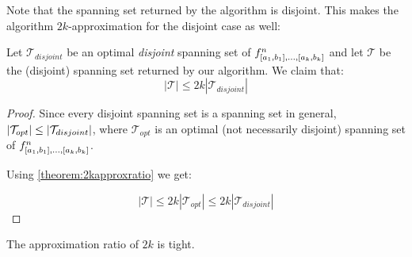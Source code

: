 Note that the spanning set returned by the algorithm
is disjoint.
This makes the algorithm $2k$-approximation
for the disjoint case as well:

\begin{theorem}
Let $\mathcal{T}_{disjoint}$ be an optimal \emph{disjoint}
spanning set of
$f^n_{[a_1, b_1], \ldots, [a_k, b_k]}$
and let $\mathcal{T}$ be the (disjoint)
spanning set returned by our algorithm.
We claim that:
\begin{equation*}
|\mathcal{T}| \leq 2k |\mathcal{T}_{disjoint}|
\end{equation*}
\end{theorem}

\begin{proof}
Since every disjoint spanning set
is a spanning set in general,
$\lvert\mathcal{T}_{opt}\rvert \leq
\lvert\mathcal{T}_{disjoint}\rvert$,
where $\mathcal{T}_{opt}$ is an optimal
(not necessarily disjoint)
spanning set of
$f^n_{[a_1, b_1], \ldots, [a_k, b_k]}$.

Using \autoref{theorem:2kapproxratio} we get:

\begin{equation*}
|\mathcal{T}| \leq 2k |\mathcal{T}_{opt}|
\leq 2k |\mathcal{T}_{disjoint}|
\end{equation*}
\end{proof}

\begin{theorem}
The approximation ratio of $2k$ is tight.
\end{theorem}

